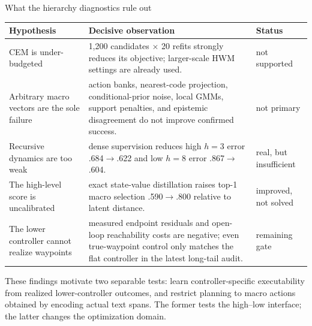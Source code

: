 \documentclass[aspectratio=169,10pt]{beamer}
\begin{document}
\begin{frame}{What the hierarchy diagnostics rule out}
\footnotesize
\begin{tabular}{p{}p{}p{}}
\toprule
Hypothesis & Decisive observation & Status\\
\midrule
CEM is under-budgeted & 1,200 candidates $\times$ 20 refits strongly reduces
its objective; larger-scale HWM settings are already used. & not supported\\
Arbitrary macro vectors are the sole failure & action banks, nearest-code
projection, conditional-prior noise, local GMMs, support penalties, and
epistemic disagreement do not improve confirmed success. & not primary\\
Recursive dynamics are too weak & dense supervision reduces high $h=3$ error
.684$\to$.622 and low $h=8$ error .867$\to$.604. & real, but insufficient\\
The high-level score is uncalibrated & exact state-value distillation raises
top-1 macro selection .590$\to$.800 relative to latent distance. & improved,
not solved\\
The lower controller cannot realize waypoints & measured endpoint residuals
and open-loop reachability costs are negative; even true-waypoint control only
matches the flat controller in the latest long-tail audit. & remaining gate\\
\bottomrule
\end{tabular}

\medskip
These findings motivate two separable tests: learn controller-specific
executability from realized lower-controller outcomes, and restrict planning
to macro actions obtained by encoding actual text spans. The former tests the
high--low interface; the latter changes the optimization domain.
\end{frame}
\end{document}

